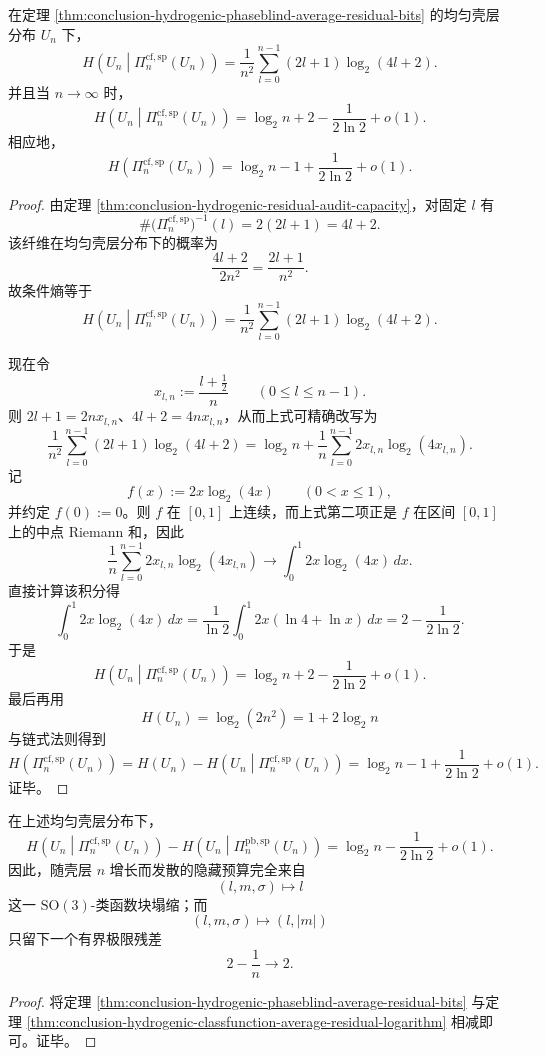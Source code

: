 \begin{theorem}[类函数规范投影的平均残余预算具有精确对数主项]\label{thm:conclusion-hydrogenic-classfunction-average-residual-logarithm}
在定理 \ref{thm:conclusion-hydrogenic-phaseblind-average-residual-bits} 的均匀壳层分布 \(U_n\) 下，
\[
H\!\left(U_n\middle|\Pi_n^{\mathrm{cf,sp}}(U_n)\right)
=
\frac1{n^2}\sum_{l=0}^{n-1}(2l+1)\log_2(4l+2).
\]
并且当 \(n\to\infty\) 时，
\[
H\!\left(U_n\middle|\Pi_n^{\mathrm{cf,sp}}(U_n)\right)
=
\log_2 n+2-\frac{1}{2\ln 2}+o(1).
\]
相应地，
\[
H\!\left(\Pi_n^{\mathrm{cf,sp}}(U_n)\right)
=
\log_2 n-1+\frac{1}{2\ln 2}+o(1).
\]
\end{theorem}
\begin{proof}
由定理 \ref{thm:conclusion-hydrogenic-residual-audit-capacity}，对固定 \(l\) 有
\[
\#\bigl(\Pi_n^{\mathrm{cf,sp}}\bigr)^{-1}(l)=2(2l+1)=4l+2.
\]
该纤维在均匀壳层分布下的概率为
\[
\frac{4l+2}{2n^2}=\frac{2l+1}{n^2}.
\]
故条件熵等于
\[
H\!\left(U_n\middle|\Pi_n^{\mathrm{cf,sp}}(U_n)\right)
=
\frac1{n^2}\sum_{l=0}^{n-1}(2l+1)\log_2(4l+2).
\]

现在令
\[
x_{l,n}:=\frac{l+\frac12}{n}
\qquad
(0\le l\le n-1).
\]
则 \(2l+1=2nx_{l,n}\)、\(4l+2=4nx_{l,n}\)，从而上式可精确改写为
\[
\frac1{n^2}\sum_{l=0}^{n-1}(2l+1)\log_2(4l+2)
=
\log_2 n
+
\frac1n\sum_{l=0}^{n-1}2x_{l,n}\log_2(4x_{l,n}).
\]
记
\[
f(x):=2x\log_2(4x)
\qquad (0<x\le 1),
\]
并约定 \(f(0):=0\)。则 \(f\) 在 \([0,1]\) 上连续，而上式第二项正是 \(f\) 在区间 \([0,1]\) 上的中点 Riemann 和，因此
\[
\frac1n\sum_{l=0}^{n-1}2x_{l,n}\log_2(4x_{l,n})
\longrightarrow
\int_0^1 2x\log_2(4x)\,dx.
\]
直接计算该积分得
\[
\int_0^1 2x\log_2(4x)\,dx
=
\frac{1}{\ln 2}\int_0^1 2x(\ln 4+\ln x)\,dx
=
2-\frac{1}{2\ln 2}.
\]
于是
\[
H\!\left(U_n\middle|\Pi_n^{\mathrm{cf,sp}}(U_n)\right)
=
\log_2 n+2-\frac{1}{2\ln 2}+o(1).
\]
最后再用
\[
H(U_n)=\log_2(2n^2)=1+2\log_2 n
\]
与链式法则得到
\[
H\!\left(\Pi_n^{\mathrm{cf,sp}}(U_n)\right)
=
H(U_n)-H\!\left(U_n\middle|\Pi_n^{\mathrm{cf,sp}}(U_n)\right)
=
\log_2 n-1+\frac{1}{2\ln 2}+o(1).
\]
证毕。
\end{proof}

\begin{corollary}[发散隐藏成本完全由非阿贝尔块塌缩承担]\label{cor:conclusion-hydrogenic-divergent-hidden-cost-from-nonabelian-blocks}
在上述均匀壳层分布下，
\[
H\!\left(U_n\middle|\Pi_n^{\mathrm{cf,sp}}(U_n)\right)
-
H\!\left(U_n\middle|\Pi_n^{\mathrm{pb,sp}}(U_n)\right)
=
\log_2 n-\frac{1}{2\ln 2}+o(1).
\]
因此，随壳层 \(n\) 增长而发散的隐藏预算完全来自
\[
(l,m,\sigma)\longmapsto l
\]
这一 \(\mathrm{SO}(3)\)-类函数块塌缩；而
\[
(l,m,\sigma)\longmapsto (l,|m|)
\]
只留下一个有界极限残差
\[
2-\frac1n\longrightarrow 2.
\]
\end{corollary}
\begin{proof}
将定理 \ref{thm:conclusion-hydrogenic-phaseblind-average-residual-bits} 与定理 \ref{thm:conclusion-hydrogenic-classfunction-average-residual-logarithm} 相减即可。证毕。
\end{proof}

